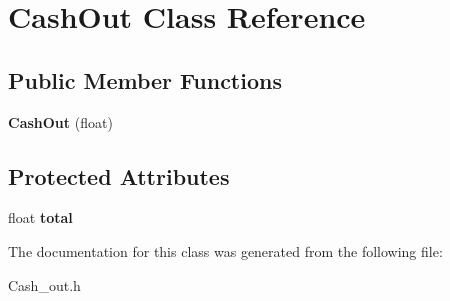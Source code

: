 \hypertarget{class_cash_out}{\section{Cash\-Out Class Reference}
\label{class_cash_out}
}
\subsection*{Public Member Functions}
\begin{DoxyCompactItemize}
\item 
\hypertarget{class_cash_out_aeb3c320946b4335d589547c21a139a54}{{\bfseries Cash\-Out} (float)}\label{class_cash_out_aeb3c320946b4335d589547c21a139a54}

\end{DoxyCompactItemize}
\subsection*{Protected Attributes}
\begin{DoxyCompactItemize}
\item 
\hypertarget{class_cash_out_a00dda22cfcc6088c0a7b0303dcd79502}{float {\bfseries total}}\label{class_cash_out_a00dda22cfcc6088c0a7b0303dcd79502}

\end{DoxyCompactItemize}


The documentation for this class was generated from the following file\-:\begin{DoxyCompactItemize}
\item 
Cash\-\_\-out.\-h\end{DoxyCompactItemize}
